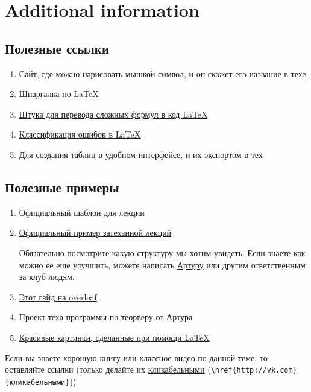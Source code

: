 \newpage
\section{Additional information}
\subsection{Полезные ссылки}
\begin{enumerate}
	\item \href{http://detexify.kirelabs.org/classify.html}{Сайт, где можно нарисовать мышкой символ, и он скажет его название в техе}
	\item \href{http://wch.github.io/latexsheet/latexsheet.pdf}{Шпаргалка по \LaTeX}
	\item \href{https://mathpix.com}{Штука для перевода сложных формул в код \LaTeX}
	\item \href{https://www.cs.utexas.edu/~witchel/projects/clarify_errorclasses.html}{Классификация ошибок в LaTeX}
	\item \href{https://www.tablesgenerator.com}{Для создания таблиц в удобном интерфейсе, и их экспортом в тех}
\end{enumerate}
\subsection{Полезные примеры} 
\begin{enumerate}
	\item  \href{https://www.overleaf.com/read/ztcjscdmtprq}{Официальный шаблон для лекции}
	\item  \href{https://www.overleaf.com/read/vjgrqfzydcyq}{Официальный пример затеханной лекций}
	
	Обязательно посмотрите какую структуру мы хотим увидеть.
	Если знаете как можно ее еще улучшить, можете написать \href{https://vk.com/kulart00}{Артуру} или другим ответственным за клуб людям.
	
	\item  \href{https://www.overleaf.com/read/hgdqksrpzrbt}{Этот гайд на overleaf}
	
	\item \href{https://www.overleaf.com/read/yryyfnmhyndd}{Проект теха программы по теорверу от Артура}
	
	\item \href{https://tex.stackexchange.com/questions/158668/nice-scientific-pictures-show-off}{ Красивые картинки, сделанные при помощи \LaTeX}
\end{enumerate}
Если вы знаете хорошую книгу или классное видео по данной теме, то оставляйте ссылки (только делайте их \href{http://vk.com}{кликабельными} (\verb|\href{http://vk.com}{кликабельными}|))

